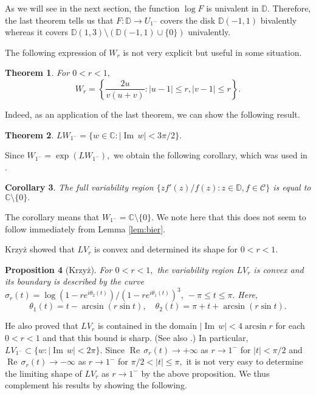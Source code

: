 \documentclass[a4paper,12pt]{amsart}
\numberwithin{equation}{section}
\newtheorem{thm}{Theorem}[section]
\newtheorem{cor}[thm]{Corollary}
\newtheorem{prop}[thm]{Proposition}
\theoremstyle{definition}
\begin{document}
As we will see in the next section, the function $\log F$ is univalent in
${{\mathbb D}}.$ Therefore, the last theorem tells us that $F:{{\mathbb D}}\to U_{1^-}$ covers
the disk ${{\mathbb D}}(-1,1)$ bivalently whereas it covers
${{\mathbb D}}(1,3)\setminus({{\mathbb D}}(-1,1)\cup\{0\})$ univalently.

The following expression of $W_r$ is not very explicit but useful
in some situation.

\begin{thm}\label{thm:W}
For $0<r<1,$
$$
W_r=\left\{\frac{2u}{v(u+v)}: |u-1|\le r, |v-1|\le r\right\}.
$$
\end{thm}

Indeed,
as an application of the last theorem, we can show the following result.

\begin{thm}\label{thm:LW}
$LW_{1^-}=\{w\in{{\mathbb C}}: |{{\operatorname{Im}\,}} w|<3\pi/2\}.$
\end{thm}

Since $W_{1^-}=\exp(LW_{1^-}),$ we obtain the following corollary,
which was used in \cite{KS11PT}.

\begin{cor}
The full variability region $\{zf'(z)/f(z): z\in{{\mathbb D}}, f\in{{\mathcal C}}\}$ is equal to
${{\mathbb C}}\setminus\{0\}.$
\end{cor}

The corollary means that $W_{1^-}={{\mathbb C}}\setminus\{0\}.$
We note here that this does not seem to follow immediately
from Lemma \ref{lem:bier}.

Krzy\.z \cite{Krzyz64} showed that $LV_r$ is convex and determined its shape
for $0<r<1.$

\begin{prop}[Krzy\.z]
For $0<r<1,$ the variability region $LV_r$ is convex and its boundary is
described by the curve 
$\sigma_r(t)=\log(1-re^{i\theta_2(t)})/(1-re^{i\theta_1(t)})^3,~
-\pi\le t\le \pi.$
Here,
$$
\theta_1(t)=t-\arcsin(r\sin t),\quad
\theta_2(t)=\pi+t+\arcsin(r\sin t).
$$
\end{prop}

He also proved that $LV_r$ is contained in the domain $|{{\operatorname{Im}\,}} w|<4\arcsin r$ 
for each $0<r<1$ and that this bound is sharp.
(See also \cite[Chap.~11]{Goodman:univ}.)
In particular, $LV_{1^-}\subset\{w: |{{\operatorname{Im}\,}} w|<2\pi\}.$
Since ${{\operatorname{Re}\,}}\sigma_r(t)\to+\infty$ as $r\to1^-$ for $|t|<\pi/2$
and ${{\operatorname{Re}\,}}\sigma_r(t)\to-\infty$ as $r\to1^-$ for $\pi/2<|t|\le\pi,$
it is not very easy to determine the limiting shape of $LV_r$ as $r\to1^-$
by the above proposition.
We thus complement his results by showing the following.
\end{document}

